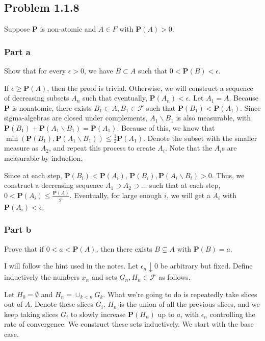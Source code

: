 \documentclass{article}
\newcommand{\F}{\mathcal{F}}
\newcommand{\prob}{\boldsymbol{P}}
\begin{document}
\subsection*{Problem 1.1.8}

Suppose $\prob$ is non-atomic and $A \in F$ with $\prob(A) > 0$.

\subsubsection*{Part a}

Show that for every $\epsilon > 0$, we have $B \subset A$ such that $0 < \prob(B) < \epsilon$.

If $\epsilon \geq \prob(A)$, then the proof is trivial. Otherwise, we will construct a sequence of decreasing subsets $A_n$ such that eventually, $\prob(A_n) < \epsilon$. Let $A_1 = A$. Because $\prob$ is nonatomic, there exists $B_1 \subset A, B_1 \in \F$ such that $\prob(B_1) < \prob(A_1)$. Since sigma-algebras are closed under complements, $A_1 \backslash B_1$ is also measurable, with $\prob(B_1) + \prob(A_1 \backslash B_1) = \prob(A_1)$. Because of this, we know that $\min(\prob(B_1), \prob(A_1 \backslash B_1)) \leq \frac{1}{2} \prob(A_1)$. Denote the subset with the smaller measure as $A_2$, and repeat this process to create $A_i$. Note that the $A_i$s are measurable by induction.

Since at each step, $\prob(B_i) < \prob(A_i)$, $\prob(B_i), \prob(A_i \backslash B_i) > 0$. Thus, we construct a decreasing sequence $A_1 \supset A_2 \supset \dots$ such that at each step, $0 <\prob(A_i) \leq \frac{\prob(A)}{2^i}$. Eventually, for large enough $i$, we will get a $A_i$ with $\prob(A_i) < \epsilon$.

\subsubsection*{Part b}

Prove that if $0 < a < \prob(A)$, then there exists $B \subsetneq A$ with $\prob(B) = a$.


I will follow the hint used in the notes. Let $\epsilon_n \downarrow 0$ be arbitrary but fixed. Define inductively the numbers $x_n$ and sets $G_n, H_n \in \F$ as follows.

Let $H_0 = \emptyset$ and $H_n = \cup_{k<n} G_k$. What we're going to do is repeatedly take slices out of $A$. Denote these slices $G_i$. $H_n$ is the union of all the previous slices, and we keep taking slices $G_i$ to slowly increase $\prob(H_n)$ up to $a$, with $\epsilon_n$ controlling the rate of convergence. We construct these sets inductively. We start with the base case.
\end{document}
